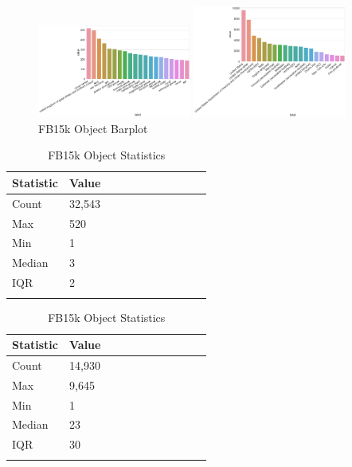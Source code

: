 
\begin{figure}[H]
	\parbox{.5\linewidth}{
   		\centering
    		\includegraphics[width=0.45\textwidth, height=0.2\textheight]{WN18_Object_Counts}
		\caption{WN18 Object Barplot}
		}
	\hfill
	\parbox{.5\linewidth}{
   		\centering
		\includegraphics[width=0.45\textwidth, height=0.2\textheight]{FB15k_Object_Counts}
		\caption{FB15k Object Barplot}
		}
\end{figure}

\begin{table}[H]
	\parbox{.5\linewidth}{
		\centering
		\begin{tabular}{lllllllllll}
  			\textbf{Statistic} & \textbf{Value}  \\
  			\hline
			Count & 32,543 \\
			Max & 520 \\
			Min & 1 \\
  			Median & 3 \\
  			IQR & 2 \\
			&
		\end{tabular}
		\caption{WN18 Object Statistics}
		}
	\hfill
	\parbox{.5\linewidth}{
		\centering
		\begin{tabular}{lllllllllll}
  			\textbf{Statistic} & \textbf{Value}  \\
  			\hline
			Count & 14,930 \\
			Max & 9,645 \\
			Min & 1 \\
  			Median & 23 \\
  			IQR & 30 \\
			&
		\end{tabular}
		\caption{FB15k Object Statistics}
		}
\end{table}

